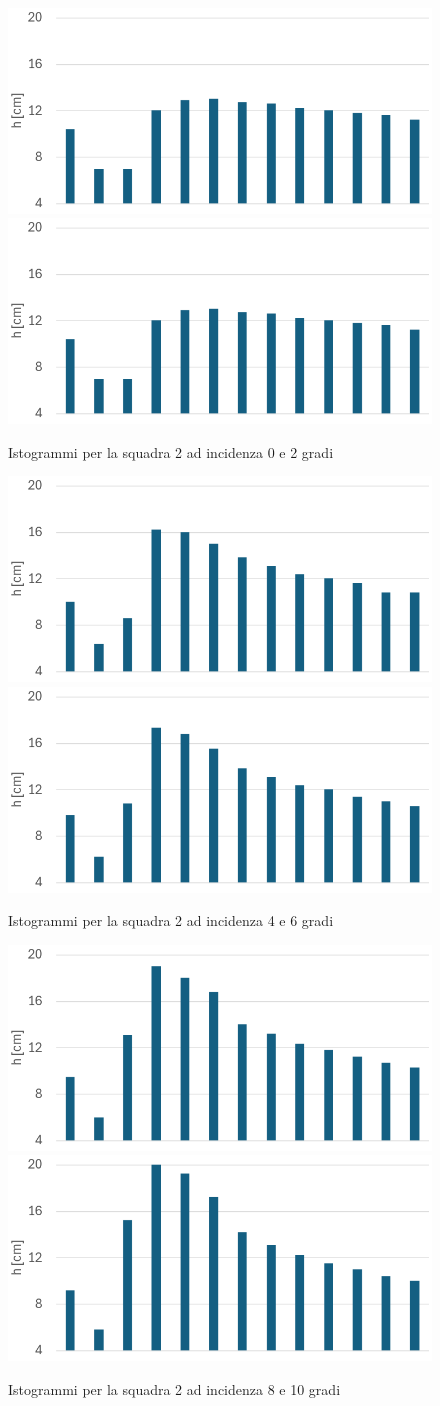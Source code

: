 \begin{figure}[H]
    \centering
    \includegraphics[width=.49\textwidth]{images/5/dsq2a0.png}
    \includegraphics[width=.49\textwidth]{images/5/dsq2a2.png}
    \caption{Istogrammi per la squadra 2 ad incidenza 0 e 2 gradi}
\end{figure}

\begin{figure}[H]
    \centering
    \includegraphics[width=.49\textwidth]{images/5/dsq2a4.png}
    \includegraphics[width=.49\textwidth]{images/5/dsq2a6.png}
    \caption{Istogrammi per la squadra 2 ad incidenza 4 e 6 gradi}
\end{figure}

\begin{figure}[H]
    \centering
    \includegraphics[width=.49\textwidth]{images/5/dsq2a8.png}
    \includegraphics[width=.49\textwidth]{images/5/dsq2a10.png}
    \caption{Istogrammi per la squadra 2 ad incidenza 8 e 10 gradi}
\end{figure}

